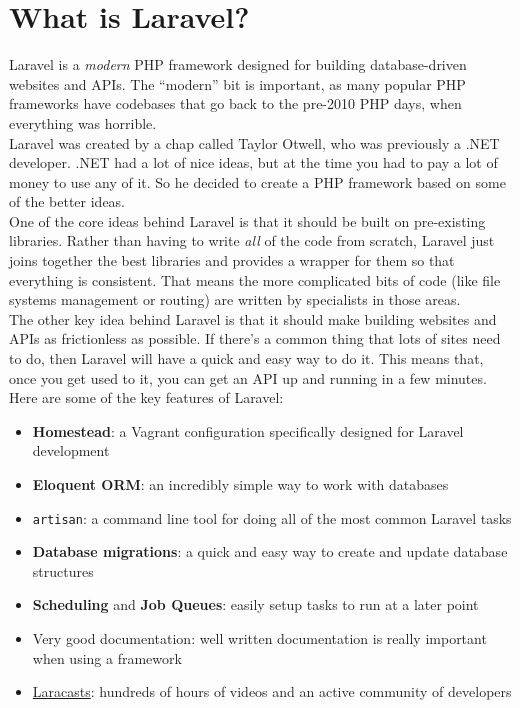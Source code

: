 \section{What is Laravel?}

Laravel is a \textit{modern} PHP framework designed for building database-driven websites and APIs. The ``modern'' bit is important, as many popular PHP frameworks have codebases that go back to the pre-2010 PHP days, when everything was horrible.
\\

Laravel was created by a chap called Taylor Otwell, who was previously a .NET developer. .NET had a lot of nice ideas, but at the time you had to pay a lot of money to use any of it. So he decided to create a PHP framework based on some of the better ideas.
\\

One of the core ideas behind Laravel is that it should be built on pre-existing libraries. Rather than having to write \textit{all} of the code from scratch, Laravel just joins together the best libraries and provides a wrapper for them so that everything is consistent. That means the more complicated bits of code (like file systems management or routing) are written by specialists in those areas.
\\

The other key idea behind Laravel is that it should make building websites and APIs as frictionless as possible. If there's a common thing that lots of sites need to do, then Laravel will have a quick and easy way to do it. This means that, once you get used to it, you can get an API up and running in a few minutes.
\\

Here are some of the key features of Laravel:

\begin{itemize}
    \item \textbf{Homestead}: a Vagrant configuration specifically designed for Laravel development
    \item \textbf{Eloquent ORM}: an incredibly simple way to work with databases
    \item \texttt{artisan}: a command line tool for doing all of the most common Laravel tasks
    \item \textbf{Database migrations}: a quick and easy way to create and update database structures
    \item \textbf{Scheduling} and \textbf{Job Queues}: easily setup tasks to run at a later point
    \item Very good documentation: well written documentation is really important when using a framework
    \item \href{https://laracasts.com}{Laracasts}: hundreds of hours of videos and an active community of developers
\end{itemize}


